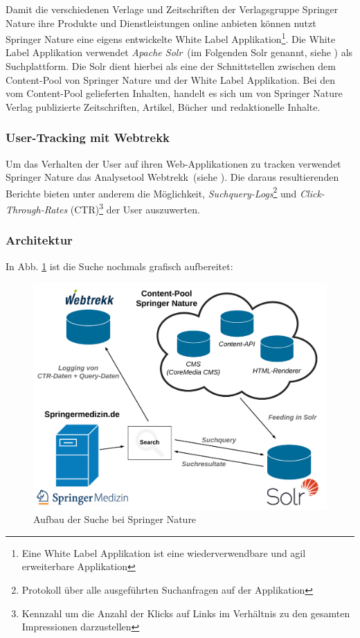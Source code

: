 Damit die verschiedenen Verlage und Zeitschriften der Verlagsgruppe Springer Nature ihre Produkte und Dienstleistungen online anbieten können nutzt Springer Nature eine eigens entwickelte White Label Applikation\footnote{Eine White Label Applikation ist eine wiederverwendbare und agil erweiterbare Applikation}. Die White Label Applikation verwendet \textit{Apache Solr}~(im Folgenden \glqq Solr\grqq{} genannt, siehe \cite{solr}) als Suchplattform. Die Solr dient hierbei als eine der Schnittstellen zwischen dem Content-Pool von Springer Nature und der White Label Applikation. Bei den vom Content-Pool gelieferten Inhalten, handelt es sich um von Springer Nature Verlag publizierte Zeitschriften, Artikel, Bücher und redaktionelle Inhalte.

\subsubsection{User-Tracking mit Webtrekk}
\label{sec:Einfuehrung:AufbauSucheBeiSpringerNature:Webtrekk}

Um das Verhalten der User auf ihren Web-Applikationen zu tracken verwendet Springer Nature das Analysetool Webtrekk~(siehe \cite{webtrekk}). Die daraus resultierenden Berichte bieten unter anderem die Möglichkeit, \textit{Suchquery-Logs}\footnote{Protokoll über alle ausgeführten Suchanfragen auf der Applikation} und \textit{Click-Through-Rates} (CTR)\footnote{Kennzahl um die Anzahl der Klicks auf Links im Verhältnis zu den gesamten Impressionen darzustellen} der User auszuwerten.

\pagebreak

\subsubsection{Architektur}
\label{sec:Einfuehrung:AufbauSucheBeiSpringerNature:Architektur}

In Abb. \ref{fig:SucheSpringerNature} ist die Suche nochmals grafisch aufbereitet:

\begin{figure}[H]
\centering
\vspace{-1.25em}
\caption[Aufbau der Suche bei Springer Nature]{Aufbau der Suche bei Springer Nature}
\vspace{.5em}
\label{fig:SucheSpringerNature}
\includegraphics[width=0.5\linewidth]{gfx/AufbauSucheSpringerNature}
\vspace{-2em}
\end{figure}

